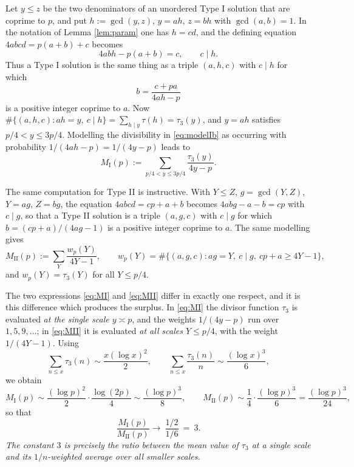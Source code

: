 \documentclass[11pt,reqno]{amsart}
\theoremstyle{plain}
\theoremstyle{definition}
\numberwithin{equation}{section}
\begin{document}
Let $y\le z$ be the two denominators of an unordered Type I solution that are coprime
to $p$, and put $h:=\gcd(y,z)$, $y=ah$, $z=bh$ with $\gcd(a,b)=1$. In the notation of
Lemma \ref{lem:param} one has $h=cd$, and the defining equation $4abcd=p(a+b)+c$
becomes
\begin{equation}\label{eq:modelI}
  4abh-p(a+b)=c,\qquad c\mid h .
\end{equation}
Thus a Type I solution is the same thing as a triple $(a,h,c)$ with $c\mid h$ for which
\begin{equation}\label{eq:modelIb}
  b=\frac{c+pa}{4ah-p}
\end{equation}
is a positive integer coprime to $a$. Now $\#\{(a,h,c): ah=y,\ c\mid h\}
=\sum_{h\mid y}\tau(h)=\tau_{3}(y)$, and $y=ah$ satisfies $p/4<y\le3p/4$. Modelling
the divisibility in \eqref{eq:modelIb} as occurring with probability $1/(4ah-p)=1/(4y-p)$
leads to
\begin{equation}\label{eq:MI}
  M_{\mathrm{I}}(p):=\sum_{p/4<y\le3p/4}\frac{\tau_{3}(y)}{4y-p}.
\end{equation}

The same computation for Type II is instructive. With $Y\le Z$, $g=\gcd(Y,Z)$,
$Y=ag$, $Z=bg$, the equation $4abcd=cp+a+b$ becomes $4abg-a-b=cp$ with $c\mid g$, so
that a Type II solution is a triple $(a,g,c)$ with $c\mid g$ for which
$b=(cp+a)/(4ag-1)$ is a positive integer coprime to $a$. The same modelling gives
\begin{equation}\label{eq:MII}
  M_{\mathrm{II}}(p):=\sum_{Y}\frac{w_{p}(Y)}{4Y-1},\qquad
  w_{p}(Y)=\#\{(a,g,c): ag=Y,\ c\mid g,\ cp+a\ge4Y-1\},
\end{equation}
and $w_{p}(Y)=\tau_{3}(Y)$ for all $Y\le p/4$.

The two expressions \eqref{eq:MI} and \eqref{eq:MII} differ in exactly one respect,
and it is this difference which produces the surplus. In \eqref{eq:MI} the divisor
function $\tau_{3}$ is evaluated \emph{at the single scale $y\asymp p$}, and the weights
$1/(4y-p)$ run over $1,5,9,\dots$; in \eqref{eq:MII} it is evaluated \emph{at all
scales $Y\le p/4$}, with the weight $1/(4Y-1)$. Using
\[
  \sum_{n\le x}\tau_{3}(n)\sim\frac{x(\log x)^{2}}{2},\qquad
  \sum_{n\le x}\frac{\tau_{3}(n)}{n}\sim\frac{(\log x)^{3}}{6},
\]
we obtain
\begin{equation}\label{eq:constants}
  M_{\mathrm{I}}(p)\sim\frac{(\log p)^{2}}{2}\cdot\frac{\log(2p)}{4}\sim\frac{(\log p)^{3}}{8},
  \qquad
  M_{\mathrm{II}}(p)\sim\frac14\cdot\frac{(\log p)^{3}}{6}=\frac{(\log p)^{3}}{24},
\end{equation}
so that
\[
  \frac{M_{\mathrm{I}}(p)}{M_{\mathrm{II}}(p)}\longrightarrow\ \frac{1/2}{1/6}\ =\ 3 .
\]
\emph{The constant $3$ is precisely the ratio between the mean value of $\tau_{3}$ at a
single scale and its $1/n$-weighted average over all smaller scales.}
\end{document}
